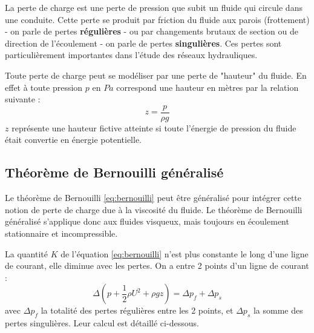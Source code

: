 La perte de charge est une perte de pression que subit un fluide qui circule dans une conduite. Cette perte se produit par friction du fluide aux parois (frottement) - on parle de pertes \textbf{régulières} - ou par changements brutaux de section ou de direction de l'écoulement - on parle de pertes \textbf{singulières}. Ces pertes sont particulièrement importantes dans l'étude des réseaux hydrauliques.

Toute perte de charge peut se modéliser par une perte de "hauteur" du fluide. En effet à toute pression $p$ en $Pa$ correspond une hauteur en mètres par la relation suivante :
%
\begin{equation}
    z = \frac{p}{\rho g}
\end{equation}
%
$z$ représente une hauteur fictive atteinte si toute l'énergie de pression du fluide était convertie en énergie potentielle.


\subsection{Théorème de Bernouilli généralisé}

Le théorème de Bernouilli \eqref{eq:bernouilli} peut être généralisé pour intégrer cette notion de perte de charge due à la viscosité du fluide. Le théorème de Bernouilli généralisé s'applique donc aux fluides visqueux, mais toujours en écoulement stationnaire et incompressible.

La quantité $K$ de l'équation \eqref{eq:bernouilli} n'est plus constante le long d'une ligne de courant, elle diminue avec les pertes. On a entre 2 points d'un ligne de courant :
%
\begin{equation}
    \Delta \left( p + \frac{1}{2}\rho U^2 + \rho g z \right) = \Delta p_f + \Delta p_s
\end{equation}
%
avec $\Delta p_f$ la totalité des pertes régulières entre les 2 points, et $\Delta p_s$ la somme des pertes singulières. Leur calcul est détaillé ci-dessous.



